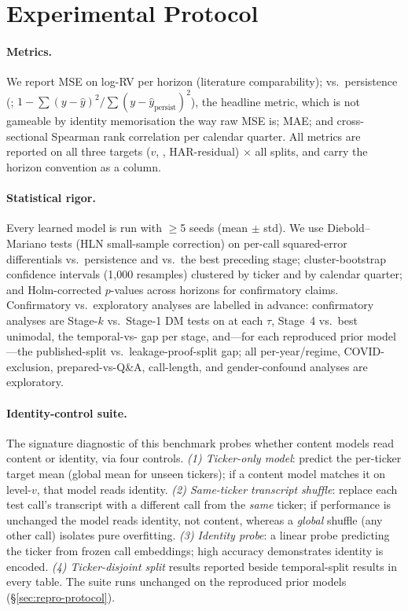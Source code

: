 \section{Experimental Protocol}
\label{sec:experiments}

\paragraph{Metrics.}
We report MSE on log-RV per horizon (literature comparability); \Rtwo{} vs.\
persistence (\citealp{gukellyxiu2020};
$1 - \sum(y-\hat y)^2 / \sum(y - \hat y_{\mathrm{persist}})^2$), the headline metric,
which is not gameable by identity memorisation the way raw MSE is; MAE; and
cross-sectional Spearman rank correlation per calendar quarter. All metrics are
reported on all three targets ($v$, \dv, HAR-residual) $\times$ all splits, and
carry the horizon convention as a column.

\paragraph{Statistical rigor.}
Every learned model is run with $\geq$5 seeds (mean $\pm$ std). We use
Diebold--Mariano tests \citep{dm1995} (HLN small-sample correction) on per-call
squared-error differentials vs.\ persistence and vs.\ the best preceding stage;
cluster-bootstrap confidence intervals (1{,}000 resamples) clustered by ticker and
by calendar quarter; and Holm-corrected $p$-values across horizons for confirmatory
claims. Confirmatory vs.\ exploratory analyses are labelled in advance: confirmatory
analyses are Stage-$k$ vs.\ Stage-1 DM tests on \dv{} at each $\tau$, Stage~4 vs.\
best unimodal, the temporal-vs-\tickerdisjoint{} gap per stage, and---for each
reproduced prior model---the published-split vs.\ leakage-proof-split gap; all
per-year/regime, COVID-exclusion, prepared-vs-Q\&A, call-length, and
gender-confound analyses are exploratory.

\paragraph{Identity-control suite.}
\label{sec:controls-protocol}
The signature diagnostic of this benchmark probes whether content models read
content or identity, via four controls. \emph{(1) Ticker-only model}: predict the
per-ticker target mean (global mean for unseen tickers); if a content model matches
it on level-$v$, that model reads identity. \emph{(2) Same-ticker transcript
shuffle}: replace each test call's transcript with a different call from the
\emph{same} ticker; if performance is unchanged the model reads identity, not
content, whereas a \emph{global} shuffle (any other call) isolates pure overfitting.
\emph{(3) Identity probe}: a linear probe predicting the ticker from frozen call
embeddings; high accuracy demonstrates identity is encoded. \emph{(4)
Ticker-disjoint split} results reported beside temporal-split results in every
table. The suite runs unchanged on the reproduced prior models
(\S\ref{sec:repro-protocol}).

